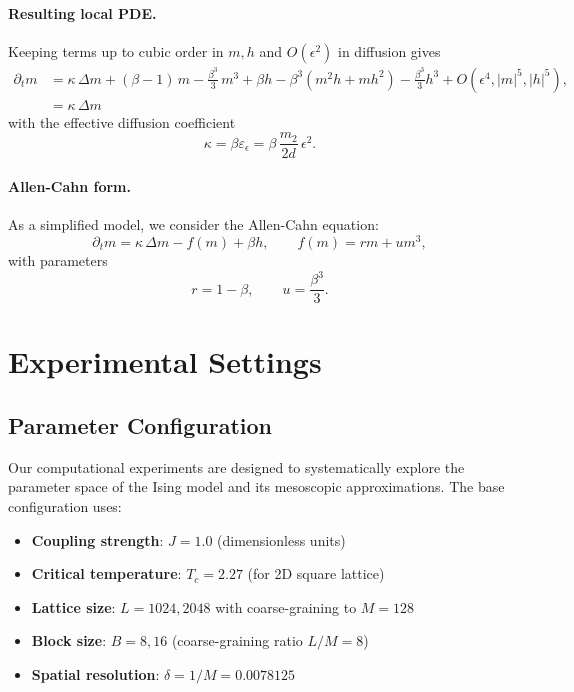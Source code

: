\documentclass[11pt,a4paper]{article}
\begin{document}
\paragraph{Resulting local PDE.}
Keeping terms up to cubic order in $m,h$ and $O(\epsilon^2)$ in diffusion gives
\begin{equation}
     \begin{split}
    \label{eq:local}
\partial_t m
& = \kappa\, \Delta m 
+ (\beta - 1)\, m - \frac{\beta^3}{3}\, m^3 + \beta h
- \beta^3(m^2 h + m h^2) - \frac{\beta^3}{3} h^3
+ O(\epsilon^4, |m|^5, |h|^5),\\
& = \kappa\, \Delta m 
        \end{split}
\end{equation}
with the effective diffusion coefficient
\begin{equation}
\kappa = \beta \varepsilon_\epsilon = \beta\, \frac{m_2}{2d}\, \epsilon^2.
\end{equation}


\paragraph{Allen-Cahn form.}
As a simplified model, we consider the Allen-Cahn equation:
\begin{equation}
    \label{eq:allen-cahn}
\partial_t m = \kappa\, \Delta m - f(m) + \beta h,
\qquad
f(m) = r m + u m^3,
\end{equation}
with parameters
\begin{equation}
r = 1-\beta, 
\qquad u = \frac{\beta^3}{3}.
\end{equation}



\section{Experimental Settings}

\subsection{Parameter Configuration}

Our computational experiments are designed to systematically explore the parameter space of the Ising model and its mesoscopic approximations. The base configuration uses:

\begin{itemize}
    \item \textbf{Coupling strength}: $J = 1.0$ (dimensionless units)
    \item \textbf{Critical temperature}: $T_c = 2.27$ (for 2D square lattice)
    \item \textbf{Lattice size}: $L = 1024, 2048$ with coarse-graining to $M = 128$
    \item \textbf{Block size}: $B = 8, 16$ (coarse-graining ratio $L/M = 8$)
    \item \textbf{Spatial resolution}: $\delta = 1/M = 0.0078125$
\end{itemize}
\end{document}
